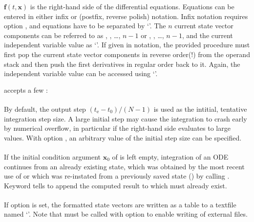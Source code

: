 \documentclass[
  fontsize=11pt,
  english,
  BCOR=10mm,DIV=12,
  bibliography=totoc,
  parskip=false,
  headings=small,
  headinclude=false,
  footinclude=false,
  twoside=false,
  UKenglish
]{pst-doc}
\begin{document}
$\mathbf{f}(t,\mathbf{x})$ is the right-hand side of the differential equations. Equations can be entered in either infix or \PS{} (postfix, reverse polish) notation. Infix notation requires option , and equations have to be separated by `\Lkeyword{|}'. The $n$ current state vector components can be referred to as , , \dots, \Lkeyword{x[}$n-1$\Lkeyword{]} or , , \dots, \Lkeyword{y[}$n-1$\Lkeyword{]}, and the current independent variable value as `'. If given in \PS{} notation, the provided procedure must first pop the current state vector components in reverse order(!) from the operand stack and then push the first derivatives in regular order back to it. Again, the independent variable value can be accessed using `'.%

\newpage
\noindent{} accepts a few \OptArgs:\\%

\noindent{}\\
\noindent By default, the output step $(t_\mathrm{e}-t_\mathrm{0})/(N-1)$ is used as the intitial, tentative integration step size. A large initial step may cause the integration to crash early by numerical overflow, in particular if the right-hand side evaluates to large values. With option , an arbitrary value of the initial step size can be specified.\\

\noindent{}\\
If the initial condition argument $\mathbf{x}_0$ of  is left empty, integration of an ODE continues from an already existing state, which was obtained by the most recent use of  or which was re-instated from a previously saved state () by calling . Keyword  tells  to append the computed result to  which must already exist.\\

\noindent{}\\
If option  is set, the formatted state vectors are written as a table to a textfile named `'. Note that  must be called with option  to enable writing of external files.\\
\end{document}
